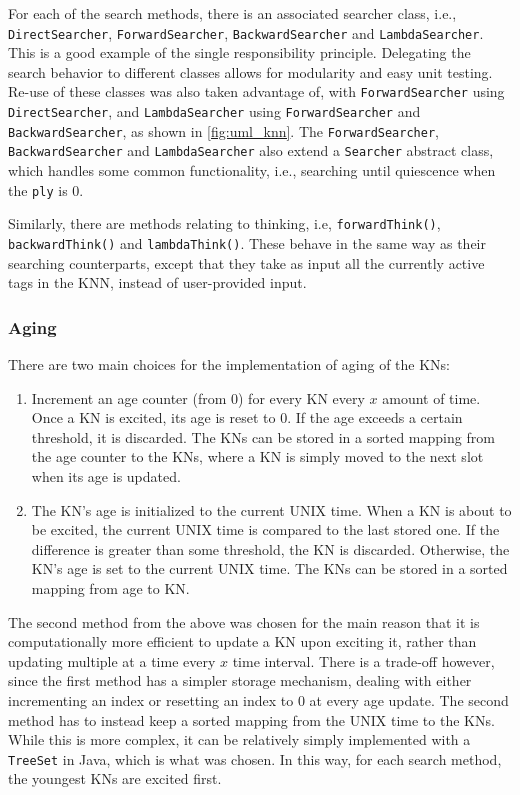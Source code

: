 \documentclass[titlepage,11pt]{article}
\newcommand{\code}[1]{\texttt{#1}}
\begin{document}
For each of the search methods, there is an associated searcher class, i.e., \code{DirectSearcher}, \code{ForwardSearcher}, \code{BackwardSearcher} and \code{LambdaSearcher}. This is a good example of the single responsibility principle. Delegating the search behavior to different classes allows for modularity and easy unit testing. Re-use of these classes was also taken advantage of, with \code{ForwardSearcher} using \code{DirectSearcher}, and \code{LambdaSearcher} using \code{ForwardSearcher} and \code{BackwardSearcher}, as shown in \cref{fig:uml_knn}. The \code{ForwardSearcher}, \code{BackwardSearcher} and \code{LambdaSearcher} also extend a \code{Searcher} abstract class, which handles some common functionality, i.e., searching until quiescence when the \code{ply} is 0.

Similarly, there are methods relating to thinking, i.e, \code{forwardThink()}, \code{backwardThink()} and \code{lambdaThink()}. These behave in the same way as their searching counterparts, except that they take as input all the currently active tags in the KNN, instead of user-provided input.

\subsubsection{Aging}

There are two main choices for the implementation of aging of the KNs:

\begin{enumerate}
	\item Increment an age counter (from 0) for every KN every $x$ amount of time. Once a KN is excited, its age is reset to 0. If the age exceeds a certain threshold, it is discarded. The KNs can be stored in a sorted mapping from the age counter to the KNs, where a KN is simply moved to the next slot when its age is updated.
	
	\item The KN's age is initialized to the current UNIX time. When a KN is about to be excited, the current UNIX time is compared to the last stored one. If the difference is greater than some threshold, the KN is discarded. Otherwise, the KN's age is set to the current UNIX time. The KNs can be stored in a sorted mapping from age to KN.
\end{enumerate}

The second method from the above was chosen for the main reason that it is computationally more efficient to update a KN upon exciting it, rather than updating multiple at a time every $x$ time interval. There is a trade-off however, since the first method has a simpler storage mechanism, dealing with either incrementing an index or resetting an index to 0 at every age update. The second method has to instead keep a sorted mapping from the UNIX time to the KNs. While this is more complex, it can be relatively simply implemented with a \code{TreeSet} in Java, which is what was chosen. In this way, for each search method, the youngest KNs are excited first.
\end{document}
